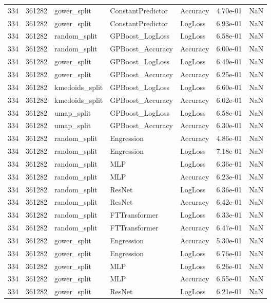 \begin{tabular}{rrlllrr}
334 & 361282 & gower\_split & ConstantPredictor & Accuracy & 4.70e-01 & NaN \\
334 & 361282 & gower\_split & ConstantPredictor & LogLoss & 6.93e-01 & NaN \\
334 & 361282 & random\_split & GPBoost\_LogLoss & LogLoss & 6.58e-01 & NaN \\
334 & 361282 & random\_split & GPBoost\_Accuracy & Accuracy & 6.00e-01 & NaN \\
334 & 361282 & gower\_split & GPBoost\_LogLoss & LogLoss & 6.49e-01 & NaN \\
334 & 361282 & gower\_split & GPBoost\_Accuracy & Accuracy & 6.25e-01 & NaN \\
334 & 361282 & kmedoids\_split & GPBoost\_LogLoss & LogLoss & 6.60e-01 & NaN \\
334 & 361282 & kmedoids\_split & GPBoost\_Accuracy & Accuracy & 6.02e-01 & NaN \\
334 & 361282 & umap\_split & GPBoost\_LogLoss & LogLoss & 6.58e-01 & NaN \\
334 & 361282 & umap\_split & GPBoost\_Accuracy & Accuracy & 6.30e-01 & NaN \\
334 & 361282 & random\_split & Engression & Accuracy & 4.86e-01 & NaN \\
334 & 361282 & random\_split & Engression & LogLoss & 7.18e-01 & NaN \\
334 & 361282 & random\_split & MLP & LogLoss & 6.36e-01 & NaN \\
334 & 361282 & random\_split & MLP & Accuracy & 6.23e-01 & NaN \\
334 & 361282 & random\_split & ResNet & LogLoss & 6.36e-01 & NaN \\
334 & 361282 & random\_split & ResNet & Accuracy & 6.42e-01 & NaN \\
334 & 361282 & random\_split & FTTransformer & LogLoss & 6.33e-01 & NaN \\
334 & 361282 & random\_split & FTTransformer & Accuracy & 6.47e-01 & NaN \\
334 & 361282 & gower\_split & Engression & Accuracy & 5.30e-01 & NaN \\
334 & 361282 & gower\_split & Engression & LogLoss & 6.76e-01 & NaN \\
334 & 361282 & gower\_split & MLP & LogLoss & 6.26e-01 & NaN \\
334 & 361282 & gower\_split & MLP & Accuracy & 6.55e-01 & NaN \\
334 & 361282 & gower\_split & ResNet & LogLoss & 6.21e-01 & NaN \\

\end{tabular}
